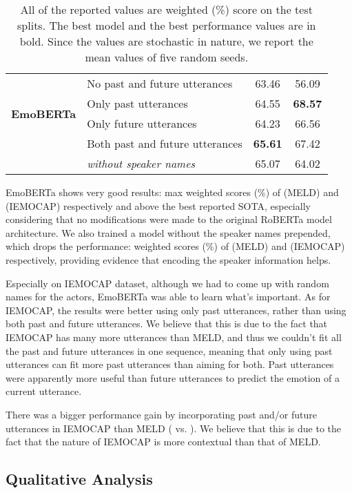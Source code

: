 \documentclass[11pt]{article}
\begin{document}
\begin{table}[h]
{\begin{tabular}{ll|c|c}
\multirow{4}{*}{\textbf{EmoBERTa}} & No past and future utterances          & 63.46          & 56.09          \\  
                                   & Only past utterances                   & 64.55          & \textbf{68.57} \\  
                                   & Only future utterances                 & 64.23          & 66.56          \\ 
                                   & Both past and future utterances        & \textbf{65.61} & 67.42          \\ 
                                   &  \textit{without speaker names} & 65.07        & 64.02         \\ \hline
\end{tabular}}
\caption{All of the reported values are weighted  (\%) score on the test splits. The best model and the best performance values are in bold. Since the values are stochastic in nature, we report the mean values of five random seeds.}
\label{tab:quantitative-analysis}
\end{table}

EmoBERTa shows very good results: max weighted  scores (\%) of  (MELD) and  (IEMOCAP) respectively and above the best reported SOTA, especially considering that no modifications were made to the original RoBERTa model architecture. We also trained a model without the speaker names prepended, which drops the performance: weighted  scores (\%) of  (MELD) and  (IEMOCAP) respectively, providing evidence that encoding the speaker information helps.

Especially on IEMOCAP dataset, although we had to come up with random names for the actors, EmoBERTa was able to learn what's important. As for IEMOCAP, the results were better using only past utterances, rather than using both past and future utterances. We believe that this is due to the fact that IEMOCAP has many more utterances than MELD, and thus we couldn't fit all the past and future utterances in one sequence, meaning that only using past utterances can fit more past utterances than aiming for both. Past utterances were apparently more useful than future utterances to predict the emotion of a current utterance.

There was a bigger performance gain by incorporating past and/or future utterances in IEMOCAP than MELD ( vs. ). We believe that this is due to the fact that the nature of IEMOCAP is more contextual than that of MELD.

\subsection{Qualitative Analysis}
 
\end{document}

